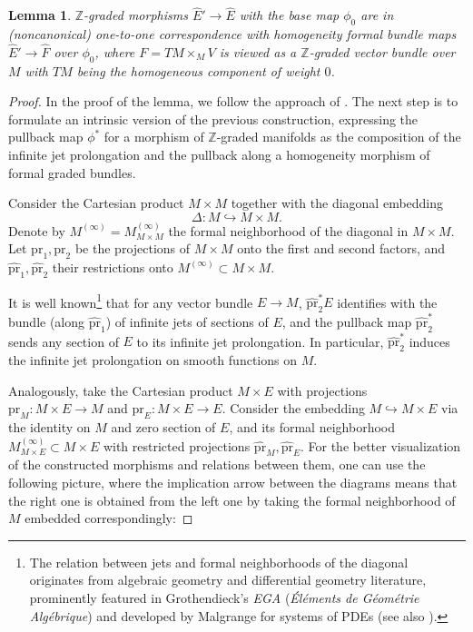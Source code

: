 \documentclass[a4paper,12pt]{amsart}
\newtheorem{lemma}{Lemma}
\newcommand{\Z}{{\mathbb Z}}
\newcommand{\p}{\mathrm{pr}}
\newcommand{\wpr}{\widehat{\p}}
\newcommand{\wE}{\widehat{E}}
\newcommand{\wF}{\widehat{F}}
\begin{document}

\begin{lemma}\label{lem:formal_geodesic}\normalfont
$\Z$-graded morphisms $\wE'\to\wE$ with the base map $\phi_0$ are in (noncanonical) one-to-one correspondence with homogeneity formal bundle maps $\wE'\to\wF$ over $\phi_0$, where $F=TM\times_M V$ is viewed as a $\Z$-graded vector bundle over $M$ with $TM$ being the homogeneous component of weight $0$.
\end{lemma}
\noindent
\begin{proof} In the proof of the lemma, we follow the approach of \cite{Bonavolonta:1304.0394}. The next step is to formulate an intrinsic version of the previous construction, expressing the pullback map $\phi^*$ for a morphism of $\mathbb{Z}$-graded manifolds as the composition of the infinite jet prolongation and the pullback along a homogeneity morphism of formal graded bundles.

\smallskip\noindent Consider the Cartesian product $M \times M$ together with the diagonal embedding 
\[\Delta: M \hookrightarrow M \times M.\] 
Denote by $M^{(\infty)} = M^{(\infty)}_{M\times M}$ the formal neighborhood of the diagonal in $M\times M$. Let $\p_1, \p_2$ be the projections of $M \times M$ onto the first and second factors, and $\wpr_1, \wpr_2$ their restrictions onto $M^{(\infty)} \subset M \times M$.

\smallskip\noindent
It is well known\footnote{The relation between jets and formal neighborhoods of the diagonal originates from algebraic geometry and differential geometry literature, prominently featured in Grothendieck's \emph{EGA} (\emph{\'{E}l\'ements de G\'eom\'etrie Alg\'ebrique}) \cite{grothendieck_ega} and developed by Malgrange for systems of PDEs \cite{malgrange_1962} (see also \cite{kock1980}).} that for any vector bundle $E\to M$, $\wpr_2^*E$ identifies with the bundle (along $\wpr_1$) of infinite jets of sections of $E$, and the pullback map $\wpr_2^*$ sends any section of $E$ to its infinite jet prolongation. In particular, $\wpr_2^*$ induces the infinite jet prolongation on smooth functions on $M$.

\smallskip\noindent Analogously, take the Cartesian product $M \times E$ with projections $\p_M\colon M \times E \to M$ and $\p_E\colon M \times E \to E$. Consider the embedding $M \hookrightarrow M \times E$ via the identity on $M$ and zero section of $E$, and its formal neighborhood $M^{(\infty)}_{M \times E} \subset M \times E$ with restricted projections $\wpr_M, \wpr_E$.
For the better visualization of the constructed morphisms and relations between them, one can use the following picture, where the implication arrow between the diagrams means that the right one is obtained from the left one by taking the formal neighborhood of $M$ embedded correspondingly:



\end{proof}
\end{document}
